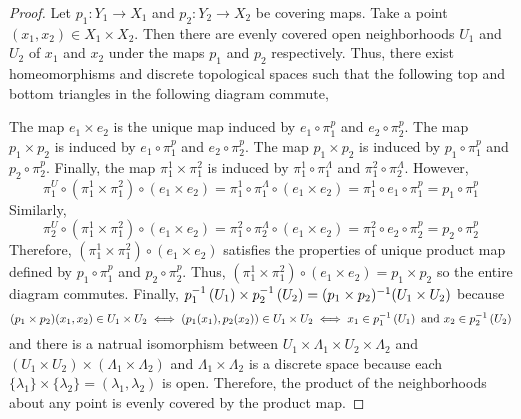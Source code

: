 \documentclass[12pt]{extarticle}
\theoremstyle{remark}
\begin{document}
\begin{proof}
Let $p_1 : Y_1 \to X_1$ and $p_2 : Y_2 \to X_2$ be covering maps. Take a point $(x_1, x_2) \in X_1 \times X_2$. Then there are evenly covered open neighborhoods $U_1$ and $U_2$ of $x_1$ and $x_2$ under the maps $p_1$ and $p_2$ respectively. Thus, there exist homeomorphisms and discrete topological spaces such that the following top and bottom triangles in the following diagram commute,
\begin{center}
\end{center}
The map $e_1 \times e_2$ is the unique map induced by $e_1 \circ \pi_1^p$ and $e_2 \circ \pi_2^p$. The map $p_1 \times p_2$ is induced by $e_1 \circ \pi_1^p$ and $e_2 \circ \pi_2^p$. The map $p_1 \times p_2$ is induced by $p_1 \circ \pi_1^p$ and $p_2 \circ \pi_2^p$. Finally, the map $\pi_1^1 \times \pi_1^2$ is induced by $\pi_1^1 \circ \pi_1^\Lambda$ and $\pi_1^2 \circ \pi_2^\Lambda$. However, \[\pi_1^U \circ (\pi_1^1 \times \pi_1^2) \circ (e_1 \times e_2) = \pi_1^1 \circ \pi_1^\Lambda \circ (e_1 \times e_2) = \pi_1^1 \circ e_1 \circ \pi_1^p = p_1 \circ \pi_1^p\]
Similarly,
\[\pi_2^U \circ (\pi_1^1 \times \pi_1^2) \circ (e_1 \times e_2) = \pi_1^2 \circ \pi_2^\Lambda \circ (e_1 \times e_2) = \pi_1^2 \circ e_2 \circ \pi_2^p = p_2 \circ \pi_2^p\]
Therefore, $(\pi_1^1 \times \pi_1^2) \circ (e_1 \times e_2)$ satisfies the properties of unique product map defined by $p_1 \circ \pi_1^p$ and $p_2 \circ \pi_2^p$. Thus, $(\pi_1^1 \times \pi_1^2) \circ (e_1 \times e_2) = p_1 \times p_2$ so the entire diagram commutes. Finally, $p_1^{-1} \left( U_1 \right) \times p_2^{-1} \left( U_2 \right) = (p_1 \times p_2)^{-1}(U_1 \times U_2)$ because \[(p_1 \times p_2)(x_1, x_2) \in U_1 \times U_2 \iff (p_1(x_1), p_2(x_2)) \in U_1 \times U_2 \iff x_1 \in p_1^{-1} \left( U_1 \right) \text{ and } x_2 \in p_2^{-1} \left( U_2 \right)\] and there is a natrual isomorphism between $U_1 \times \Lambda_1 \times U_2 \times \Lambda_2$ and $(U_1 \times U_2) \times (\Lambda_1 \times \Lambda_2)$ and $\Lambda_1 \times \Lambda_2$ is a discrete space because each $\{\lambda_1\} \times \{\lambda_2\} = (\lambda_1, \lambda_2)$ is open. Therefore, the product of the neighborhoods about any point is evenly covered by the product map.
\end{proof}
\end{document}
